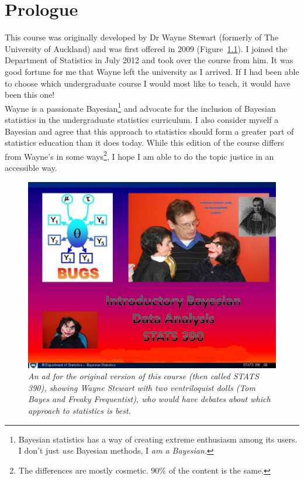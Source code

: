 \chapter{Prologue}
This course was originally developed by Dr Wayne Stewart (formerly of The
University of
Auckland) and was first offered in 2009 (Figure~\ref{fig:wayne}).
I joined the Department of Statistics in July 2012
and took over the course from him. It was good fortune for me that Wayne left
the university as I arrived. If I had been able to choose which undergraduate
course I would most like to teach, it would have been this one!\\

Wayne is a passionate Bayesian\footnote{Bayesian statistics has a way of
creating extreme enthusiasm among its users. I don't just {\it use} Bayesian
methods, I {\it am a Bayesian}.}
and advocate
for the inclusion of Bayesian statistics in the undergraduate
statistics curriculum. I also consider myself a Bayesian and agree that this
approach to statistics should form a greater part of statistics education
than it does today.
While this edition of the course differs from Wayne's in some ways\footnote{
The differences are mostly cosmetic. 90\% of the content is the same.},
I hope I am able to do the topic justice in an accessible way.\\

\begin{figure}[ht!]
\begin{center}
\includegraphics[scale=0.5]{Figures/390course.jpg}
\end{center}
\caption{\it An ad for the original version of this course (then called
STATS 390), showing Wayne Stewart with two ventriloquist dolls (Tom Bayes and
Freaky Frequentist), who would have debates about which approach to statistics
is best.\label{fig:wayne}}
\end{figure}

